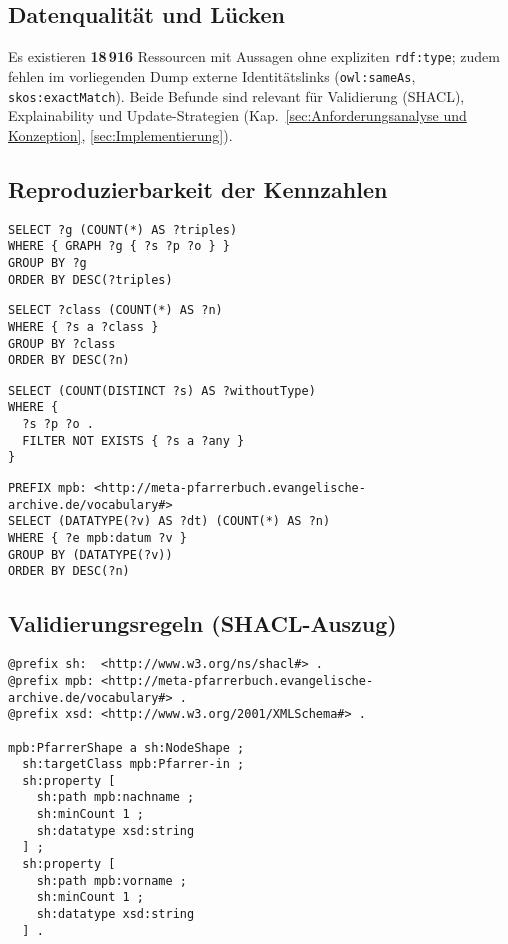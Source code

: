 \subsection*{Datenqualität und Lücken}
Es existieren \textbf{18\,916} Ressourcen mit Aussagen ohne expliziten \texttt{rdf:type}; zudem fehlen im vorliegenden Dump externe Identitätslinks (\texttt{owl:sameAs}, \texttt{skos:exactMatch}). Beide Befunde sind relevant für Validierung (SHACL), Explainability und Update-Strategien (Kap.~\ref{sec:Anforderungsanalyse und Konzeption}, \ref{sec:Implementierung}).

\subsection*{Reproduzierbarkeit der Kennzahlen}
\begin{lstlisting}[language=SPARQL,caption={Tripel je benanntem Graphen.},label={lst:graph-count}]
SELECT ?g (COUNT(*) AS ?triples)
WHERE { GRAPH ?g { ?s ?p ?o } }
GROUP BY ?g
ORDER BY DESC(?triples)
\end{lstlisting}

\begin{lstlisting}[language=SPARQL,caption={Top-Klassen nach Instanzzahl.},label={lst:class-count}]
SELECT ?class (COUNT(*) AS ?n)
WHERE { ?s a ?class }
GROUP BY ?class
ORDER BY DESC(?n)
\end{lstlisting}

\begin{lstlisting}[language=SPARQL,caption={Ressourcen ohne expliziten \texttt{rdf:type}.},label={lst:without-type}]
SELECT (COUNT(DISTINCT ?s) AS ?withoutType)
WHERE {
  ?s ?p ?o .
  FILTER NOT EXISTS { ?s a ?any }
}
\end{lstlisting}

\begin{lstlisting}[language=SPARQL,caption={Datentyp-Histogramm für Zeitangaben.},label={lst:datatype-histo}]
PREFIX mpb: <http://meta-pfarrerbuch.evangelische-archive.de/vocabulary#>
SELECT (DATATYPE(?v) AS ?dt) (COUNT(*) AS ?n)
WHERE { ?e mpb:datum ?v }
GROUP BY (DATATYPE(?v))
ORDER BY DESC(?n)
\end{lstlisting}

\subsection*{Validierungsregeln (SHACL-Auszug)}
\begin{lstlisting}[language=Turtle,caption={SHACL-Shape für \texttt{mpb:Pfarrer-in}.},label={lst:shacl-pfarrer}]
@prefix sh:  <http://www.w3.org/ns/shacl#> .
@prefix mpb: <http://meta-pfarrerbuch.evangelische-archive.de/vocabulary#> .
@prefix xsd: <http://www.w3.org/2001/XMLSchema#> .

mpb:PfarrerShape a sh:NodeShape ;
  sh:targetClass mpb:Pfarrer-in ;
  sh:property [
    sh:path mpb:nachname ;
    sh:minCount 1 ;
    sh:datatype xsd:string
  ] ;
  sh:property [
    sh:path mpb:vorname ;
    sh:minCount 1 ;
    sh:datatype xsd:string
  ] .
\end{lstlisting}

